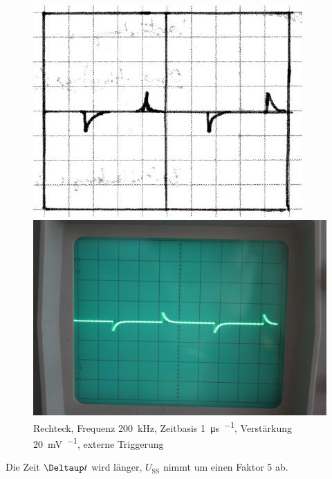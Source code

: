 \begin{figure}
	\centering
	\begin{minipage}{.45\linewidth}
	\includegraphics[width=\linewidth]{Skizzen/IMG_0755-1500.jpg}
	\end{minipage}
	\hfill
	\begin{minipage}{.45\linewidth}
	\includegraphics[width=\linewidth]{Fotos/IMG_0755-1500.jpg}
	\end{minipage}
	\caption{%
		Rechteck, Frequenz \SI{200}{\kilo\hertz}, Zeitbasis \SI{1}{\micro\second\per\division}, Verstärkung \SI{20}{\milli\volt\per\division}, externe Triggerung
	}
	\label{fig:0755}
\end{figure}

Die Zeit $\Deltaup t$ wird länger, $U_\text{SS}$ nimmt um einen Faktor 5 ab.

